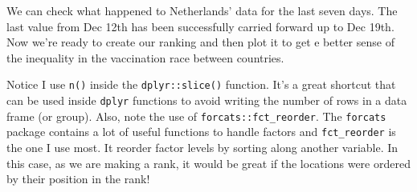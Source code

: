 \documentclass[
]{book}
\begin{document}
We can check what happened to Netherlands' data for the last seven days. The last value from Dec 12th has been successfully carried forward up to Dec 19th. Now we're ready to create our ranking and then plot it to get e better sense of the inequality in the vaccination race between countries.

Notice I use \texttt{n()} inside the \texttt{dplyr::slice()} function. It's a great shortcut that can be used inside \texttt{dplyr} functions to avoid writing the number of rows in a data frame (or group). Also, note the use of \texttt{forcats::fct\_reorder}. The \texttt{forcats} package contains a lot of useful functions to handle factors and \texttt{fct\_reorder} is the one I use most. It reorder factor levels by sorting along another variable. In this case, as we are making a rank, it would be great if the locations were ordered by their position in the rank!
\end{document}
